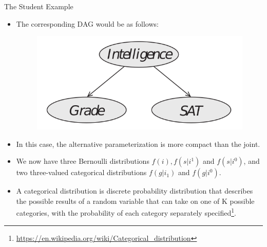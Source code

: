 \documentclass[handout]{beamer}
\begin{document}
\begin{frame}{The Student Example}
\scriptsize{
\begin{itemize}

\item The corresponding DAG would be as follows:


\begin{figure}[h!]
	\centering
	\includegraphics[scale=0.3]{pics/sat2.png}
	\end{figure} 

	\item In this case, the alternative parameterization is more compact than the joint. 
	\item We now have three Bernoulli distributions $f(i), f(s | i^1)$ and $f(s | i^0)$, and two three-valued categorical distributions $f(g | i_1 )$ and $f(g | i^0)$.
	\item A categorical distribution is  discrete probability distribution that describes the possible results of a random variable that can take on one of K possible categories, with the probability of each category separately specified\footnote{\url{https://en.wikipedia.org/wiki/Categorical_distribution}}.

	
\end{itemize}



} 

\end{frame}
\end{document}
